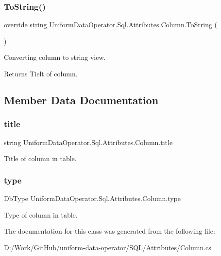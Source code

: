 \subsubsection{\texorpdfstring{To\+String()}{ToString()}}
{\footnotesize\ttfamily override string Uniform\+Data\+Operator.\+Sql.\+Attributes.\+Column.\+To\+String (\begin{DoxyParamCaption}{ }\end{DoxyParamCaption})}



Converting column to string view. 

\begin{DoxyReturn}{Returns}
Tielt of column.
\end{DoxyReturn}


\subsection{Member Data Documentation}
\mbox{\label{class_uniform_data_operator_1_1_sql_1_1_attributes_1_1_column_af17925ba835ca424a854689016526e93}} 
\subsubsection{\texorpdfstring{title}{title}}
{\footnotesize\ttfamily string Uniform\+Data\+Operator.\+Sql.\+Attributes.\+Column.\+title}



Title of column in table. 

\mbox{\label{class_uniform_data_operator_1_1_sql_1_1_attributes_1_1_column_ad42f01b863fcea9172fc5efe2b8a0834}} 
\subsubsection{\texorpdfstring{type}{type}}
{\footnotesize\ttfamily Db\+Type Uniform\+Data\+Operator.\+Sql.\+Attributes.\+Column.\+type}



Type of column in table. 



The documentation for this class was generated from the following file\+:\begin{DoxyCompactItemize}
\item 
D\+:/\+Work/\+Git\+Hub/uniform-\/data-\/operator/\+S\+Q\+L/\+Attributes/Column.\+cs\end{DoxyCompactItemize}
